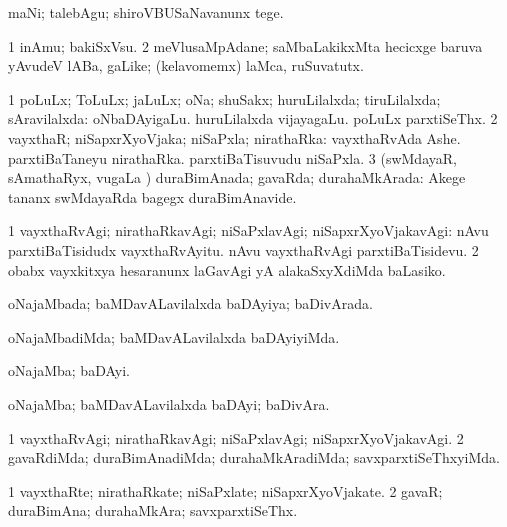 \noindent 
\gl{\akirx}
\expl{}
\bmng
 maNi; talebAgu; shiroVBUSaNavanunx tege. 
\emng
\eentry

\bentry
{} 
\gl{\nA}
\bmng
\bnum
\num{1} inAmu; bakiSxVsu. 
\num{2} meVlusaMpAdane; saMbaLakikxMta hecicxge baruva yAvudeV lABa, gaLike; (kelavomemx) laMca, ruSuvatutx. 
\enum
\emng
\eentry

\bentry
{} 
\gl{\gu}
\expl{}
\bmng
\bnum
\num{1} poLuLx; ToLuLx; jaLuLx; oNa; shuSakx; huruLilalxda; tiruLilalxda; sAravilalxda:  oNbaDAyigaLu.  huruLilalxda vijayagaLu.  poLuLx parxtiSeThx. 
\num{2} vayxthaR; niSapxrXyoVjaka; niSaPxla; nirathaRka:  vayxthaRvAda Ashe.  parxtiBaTaneyu nirathaRka.  parxtiBaTisuvudu niSaPxla. 
\num{3} (swMdayaR, sAmathaRyx, \mo vugaLa \vi) duraBimAnada; gavaRda; durahaMkArada:  Akege tananx swMdayaRda bagegx duraBimAnavide. 
\enum
\emng

\noindent 
\gl{\pagu}
\expl{}
\bmng
\bnum
\num{1}  vayxthaRvAgi; nirathaRkavAgi; niSaPxlavAgi; niSapxrXyoVjakavAgi:  nAvu parxtiBaTisidudx vayxthaRvAyitu. nAvu vayxthaRvAgi parxtiBaTisidevu. 
\num{2}  obabx vayxkitxya hesaranunx laGavAgi yA alakaSxyXdiMda baLasiko. 
\enum
\emng
\eentry

\bentry
{} 
\gl{\gu}
\expl{}
\bmng
 oNajaMbada; baMDavALavilalxda baDAyiya; baDivArada. 
\emng
\eentry

\bentry
{} 
\gl{\kirxvi}
\expl{}
\bmng
 oNajaMbadiMda; baMDavALavilalxda baDAyiyiMda. 
\emng
\eentry

\bentry
{} 
\gl{\nA}
\expl{}
\bmng
 oNajaMba; baDAyi. 
\emng
\eentry

\bentry
{} 
\gl{\nA}
\expl{}
\bmng
 oNajaMba; baMDavALavilalxda baDAyi; baDivAra. 
\emng
\eentry

\bentry
{} 
\gl{\kirxvi}
\expl{}
\bmng
\bnum
\num{1} vayxthaRvAgi; nirathaRkavAgi; niSaPxlavAgi; niSapxrXyoVjakavAgi. 
\num{2} gavaRdiMda; duraBimAnadiMda; durahaMkAradiMda; savxparxtiSeThxyiMda. 
\enum
\emng
\eentry

\bentry
{} 
\gl{\nA}
\expl{}
\bmng
\bnum
\num{1} vayxthaRte; nirathaRkate; niSaPxlate; niSapxrXyoVjakate. 
\num{2} gavaR; duraBimAna; durahaMkAra; savxparxtiSeThx. 
\enum
\emng
\eentry

